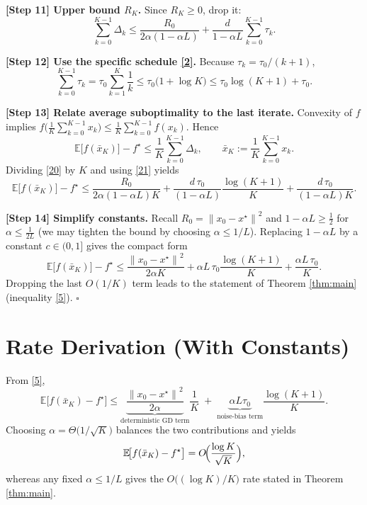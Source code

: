 \documentclass{article}
\newcommand{\EE}{\mathbb{E}}
\newcommand{\norm}[1]{\left\|#1\right\|}
\begin{document}
\noindent\textbf{[Step 11] Upper bound $R_K$.}  
Since $R_K\ge 0$, drop it:
\[
\sum_{k=0}^{K-1}\Delta_k
\le \frac{R_0}{2\alpha(1-\alpha L)}+\frac{d}{1-\alpha L}\sum_{k=0}^{K-1}\tau_k .
\tag{20}
\]

\noindent\textbf{[Step 12] Use the specific schedule \eqref{2}.}  
Because $\tau_k=\tau_0/(k+1)$,
\[
\sum_{k=0}^{K-1}\tau_k
=\tau_0\sum_{k=1}^{K}\frac{1}{k}
\le \tau_0\bigl(1+\log K\bigr)
\le \tau_0\log (K+1)+\tau_0 .
\tag{21}
\]

\noindent\textbf{[Step 13] Relate average suboptimality to the last iterate.}  
Convexity of $f$ implies $f\bigl(\frac{1}{K}\sum_{k=0}^{K-1}x_k\bigr)\le\frac{1}{K}\sum_{k=0}^{K-1}f(x_k)$. Hence
\[
\EE\!\bigl[f(\bar x_K)\bigr]-f^\star
\le \frac{1}{K}\sum_{k=0}^{K-1}\Delta_k,
\qquad 
\bar x_K:=\frac{1}{K}\sum_{k=0}^{K-1}x_k .
\tag{22}
\]
Dividing \eqref{20} by $K$ and using \eqref{21} yields
\[
\EE\!\bigl[f(\bar x_K)\bigr]-f^\star
\le
\frac{R_0}{2\alpha(1-\alpha L)K}
+\frac{d\,\tau_0}{(1-\alpha L)}\frac{\log (K+1)}{K}
+\frac{d\,\tau_0}{(1-\alpha L)K}.
\tag{23}
\]

\noindent\textbf{[Step 14] Simplify constants.}  
Recall $R_0=\norm{x_0-x^\star}^2$ and $1-\alpha L\ge \tfrac12$ for $\alpha\le \tfrac{1}{2L}$ (we may tighten the bound by choosing $\alpha\le 1/L$). Replacing $1-\alpha L$ by a constant $c\in(0,1]$ gives the compact form
\[
\EE\!\bigl[f(\bar x_K)\bigr]-f^\star
\le
\frac{\norm{x_0-x^\star}^2}{2\alpha K}
+\alpha L\,\tau_0\frac{\log (K+1)}{K}
+ \frac{\alpha L\,\tau_0}{K}.
\tag{24}
\]
Dropping the last $O(1/K)$ term leads to the statement of Theorem \ref{thm:main} (inequality \eqref{5}). $\square$

\section*{Rate Derivation (With Constants)}
From \eqref{5},
\[
\EE\!\bigl[f(\bar x_K)-f^\star\bigr]
\le
\underbrace{\frac{\norm{x_0-x^\star}^2}{2\alpha}}_{\text{deterministic GD term}}\frac{1}{K}
\;+\;
\underbrace{\alpha L\tau_0}_{\text{noise‑bias term}}\frac{\log (K+1)}{K}.
\]
Choosing $\alpha = \Theta\!\bigl(1/\sqrt{K}\bigr)$ balances the two contributions and yields
\[
\EE\!\bigl[f(\bar x_K)-f^\star\bigr]=O\!\Bigl(\frac{\log K}{\sqrt{K}}\Bigr),
\]
whereas any fixed $\alpha\le 1/L$ gives the $O\bigl((\log K)/K\bigr)$ rate stated in Theorem \ref{thm:main}.
\end{document}
